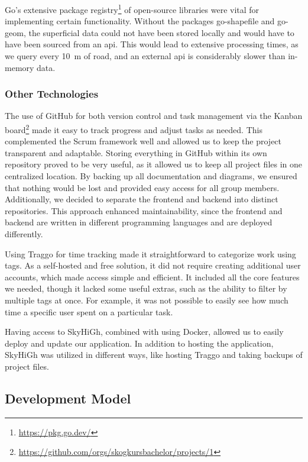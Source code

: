 Go's extensive package registry\footnote{\url{https://pkg.go.dev/}} of open-source libraries were vital for implementing certain functionality. Without the packages go-shapefile and go-geom, the superficial data could not have been stored locally and would have to have been sourced from an \acrshort{api}. This would lead to extensive processing times, as we query every \qty{10}{\meter} of road, and an external \acrshort{api} is considerably slower than in-memory data.

\subsubsection{Other Technologies}

The use of GitHub for both version control and task management via the Kanban board\footnote{\url{https://github.com/orgs/skogkursbachelor/projects/1}} made it easy to track progress and adjust tasks as needed. This complemented the Scrum framework well and allowed us to keep the project transparent and adaptable. Storing everything in GitHub within its own repository proved to be very useful, as it allowed us to keep all project files in one centralized location. By backing up all documentation and diagrams, we ensured that nothing would be lost and provided easy access for all group members. Additionally, we decided to separate the frontend and backend into distinct repositories. This approach enhanced maintainability, since the frontend and backend are written in different programming languages and are deployed differently.

Using Traggo for time tracking made it straightforward to categorize work using tags. As a self-hosted and free solution, it did not require creating additional user accounts, which made access simple and efficient. It included all the core features we needed, though it lacked some useful extras, such as the ability to filter by multiple tags at once. For example, it was not possible to easily see how much time a specific user spent on a particular task.

Having access to SkyHiGh, combined with using Docker, allowed us to easily deploy and update our application. In addition to hosting the application, SkyHiGh was utilized in different ways, like hosting Traggo and taking backups of project files. 

\subsection{Development Model}

